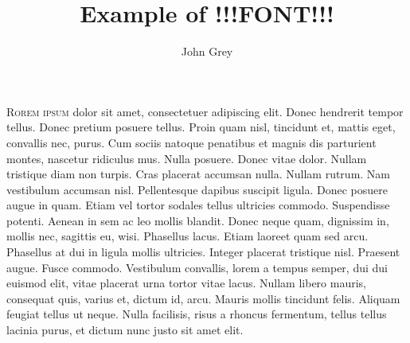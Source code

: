 \documentclass[12pt]{article}
\title{Example of !!!FONT!!!}
\author{John Grey}
\begin{document}
\maketitle

\lettrine[loversize=0.1, lines=4,depth=1,findent=4pt,nindent=4pt]{R}{orem ipsum} dolor sit amet,
consectetuer adipiscing elit.  Donec hendrerit tempor tellus.  Donec pretium
posuere tellus.  Proin quam nisl, tincidunt et, mattis eget, convallis nec,
purus.  Cum sociis natoque penatibus et magnis dis parturient montes, nascetur
ridiculus mus.  Nulla posuere.  Donec vitae dolor.  Nullam tristique diam non
turpis.  Cras placerat accumsan nulla.  Nullam rutrum.  Nam vestibulum accumsan
nisl. Pellentesque dapibus suscipit ligula.  Donec posuere augue in quam.  Etiam
vel tortor sodales tellus ultricies commodo.  Suspendisse potenti.  Aenean in
sem ac leo mollis blandit.  Donec neque quam, dignissim in, mollis nec, sagittis
eu, wisi.  Phasellus lacus.  Etiam laoreet quam sed arcu.  Phasellus at dui in
ligula mollis ultricies.  Integer placerat tristique nisl.  Praesent augue.
Fusce commodo.  Vestibulum convallis, lorem a tempus semper, dui dui euismod
elit, vitae placerat urna tortor vitae lacus.  Nullam libero mauris, consequat
quis, varius et, dictum id, arcu.  Mauris mollis tincidunt felis.  Aliquam
feugiat tellus ut neque.  Nulla facilisis, risus a rhoncus fermentum, tellus
tellus lacinia purus, et dictum nunc justo sit amet elit.
\end{document}
